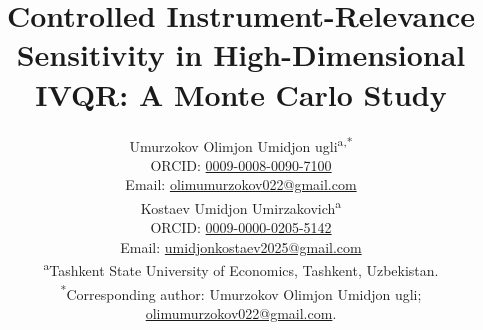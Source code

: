 
\title{Controlled Instrument-Relevance Sensitivity in High-Dimensional IVQR: A Monte Carlo Study}
\author{\begin{minipage}{\dimexpr\textwidth-2\tabcolsep\relax}\centering
\normalsize Umurzokov Olimjon Umidjon ugli\textsuperscript{a,*}\\
\small ORCID: \href{https://orcid.org/0009-0008-0090-7100}{0009-0008-0090-7100}\\
Email: \href{mailto:olimumurzokov022@gmail.com}{olimumurzokov022@gmail.com}\\[0.7em]
\normalsize Kostaev Umidjon Umirzakovich\textsuperscript{a}\\
\small ORCID: \href{https://orcid.org/0009-0000-0205-5142}{0009-0000-0205-5142}\\
Email: \href{mailto:umidjonkostaev2025@gmail.com}{umidjonkostaev2025@gmail.com}\\[0.7em]
\textsuperscript{a}Tashkent State University of Economics, Tashkent, Uzbekistan.\\[0.4em]
\textsuperscript{*}Corresponding author: Umurzokov Olimjon Umidjon ugli;\\
\href{mailto:olimumurzokov022@gmail.com}{olimumurzokov022@gmail.com}.
\end{minipage}}
\date{}

